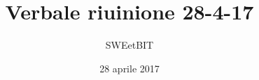 


\usepackage{ragged2e}

\title{\textbf{Verbale riuinione 28-4-17}}
\author{SWEetBIT}

\date{28 aprile 2017}




\makeFrontPage

\tableofcontents





